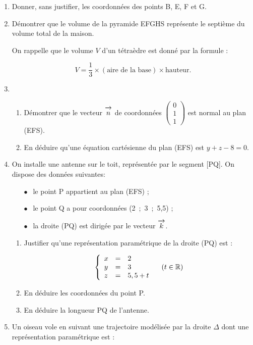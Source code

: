 \documentclass[10pt,a4paper]{article}
\newcommand{\R}{\mathbb{R}}
\newcommand{\vect}[1]{\overrightarrow{\,\mathstrut#1\,}}
\begin{document}
\begin{enumerate}
\item Donner, sans justifier, les coordonnées des points B, E, F et G.
\item Démontrer que le volume de la pyramide EFGHS représente le septième du volume total de la maison.

On rappelle que le volume $V$ d'un tétraèdre est donné par la formule :

\[V = \dfrac13 \times (\text{aire de la base}) \times  \text{hauteur}.\]
\item 
	\begin{enumerate}
		\item Démontrer que le vecteur $\vect{n}$ de coordonnées $\begin{pmatrix}0\\1\\1\end{pmatrix}$ est normal au plan (EFS).
		\item En déduire qu'une équation cartésienne du plan (EFS) est $y + z - 8 = 0$.
	\end{enumerate}	
\item On installe une antenne sur le toit, représentée par le segment [PQ]. On dispose des données suivantes:

\begin{itemize}
\item[$\bullet~~$] le point P appartient au plan (EFS) ;
\item[$\bullet~~$] le point Q a pour coordonnées (2~;~3~;~5,5) ;
\item[$\bullet~~$] la droite (PQ) est dirigée par le vecteur $\vect{k}$.
\end{itemize}
	\begin{enumerate}
		\item Justifier qu'une représentation paramétrique de la droite (PQ) est :

\[\left\{\begin{array}{l c l}
x &=&2\\
y &=&3\\
z &=& 5,5 + t
\end{array}\right. \quad (t \in \R)\]
		\item En déduire les coordonnées du point P.
		\item En déduire la longueur PQ de l'antenne.
	\end{enumerate}	
\item Un oiseau vole en suivant une trajectoire modélisée par la droite $\Delta$ dont une représentation paramétrique est :


\end{enumerate}
\end{document}
